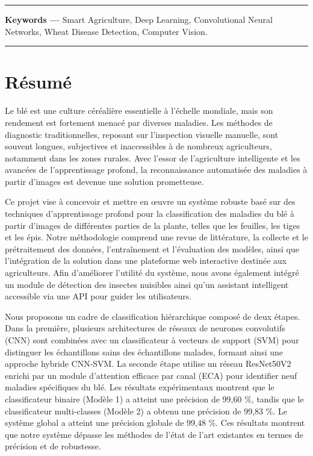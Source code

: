 \vspace{1cm}
\noindent\rule{\linewidth}{1pt}
\noindent
\textbf{Keywords —} Smart Agriculture, Deep Learning, Convolutional Neural Networks, Wheat Disease Detection, Computer Vision.\\
\noindent\rule{\linewidth}{1pt}






 

\cleardoublepage
{}
\chapter*{{\Huge\bfseries Résumé}}
\thispagestyle{noheader}

\vspace{0.5cm}

Le blé est une culture céréalière essentielle à l’échelle mondiale, mais son rendement est fortement menacé par diverses maladies. Les méthodes de diagnostic traditionnelles, reposant sur l’inspection visuelle manuelle, sont souvent longues, subjectives et inaccessibles à de nombreux agriculteurs, notamment dans les zones rurales. Avec l’essor de l’agriculture intelligente et les avancées de l’apprentissage profond, la reconnaissance automatisée des maladies à partir d’images est devenue une solution prometteuse.

Ce projet vise à concevoir et mettre en œuvre un système robuste basé sur des techniques d’apprentissage profond pour la classification des maladies du blé à partir d’images de différentes parties de la plante, telles que les feuilles, les tiges et les épis. Notre méthodologie comprend une revue de littérature, la collecte et le prétraitement des données, l’entraînement et l’évaluation des modèles, ainsi que l’intégration de la solution dans une plateforme web interactive destinée aux agriculteurs. Afin d’améliorer l’utilité du système, nous avons également intégré un module de détection des insectes nuisibles ainsi qu’un assistant intelligent accessible via une API pour guider les utilisateurs.

Nous proposons un cadre de classification hiérarchique composé de deux étapes. Dans la première, plusieurs architectures de réseaux de neurones convolutifs (CNN) sont combinées avec un classificateur à vecteurs de support (SVM) pour distinguer les échantillons sains des échantillons malades, formant ainsi une approche hybride CNN-SVM. La seconde étape utilise un réseau ResNet50V2 enrichi par un module d’attention efficace par canal (ECA) pour identifier neuf maladies spécifiques du blé. Les résultats expérimentaux montrent que le classificateur binaire (Modèle 1) a atteint une précision de 99,60 \%, tandis que le classificateur multi-classes (Modèle 2) a obtenu une précision de 99,83 \%. Le système global a atteint une précision globale de 99,48 \%. Ces résultats montrent que notre système dépasse les méthodes de l’état de l’art existantes en termes de précision et de robustesse.

